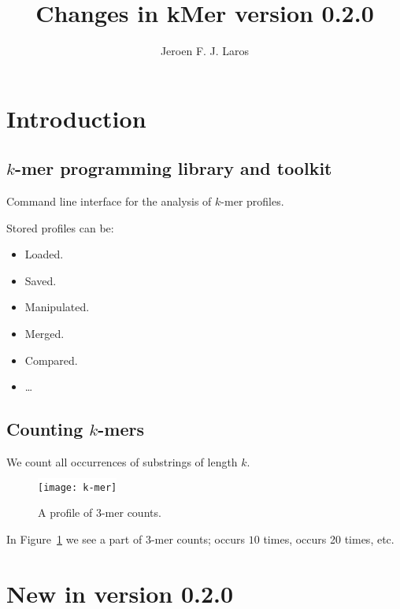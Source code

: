\documentclass[slidestop]{beamer}
\title{Changes in kMer version 0.2.0}
\author{Jeroen F. J. Laros}
\begin{document}

\bodytemplate

\section{Introduction}
\subsection{$k$-mer programming library and toolkit}
\begin{pframe}
  Command line interface for the analysis of $k$-mer profiles.
  \bigskip
  \pause

  Stored profiles can be:
  \begin{itemize}
    \item Loaded.
    \item Saved.
    \item Manipulated.
    \item Merged.
    \item Compared.
    \item \ldots
  \end{itemize}

  \vfill
\end{pframe}

\subsection{Counting $k$-mers}
\begin{pframe}
  We count all occurrences of substrings of length $k$.
  \pause

  \begin{figure}
    \colorbox{white}{
      \texttt{[image: k-mer]}
    }
    \vspace{-0.5cm}
    \caption{A profile of $3$-mer counts.} \label{fig:kmerprofile}
  \end{figure}

  In Figure~\ref{fig:kmerprofile} we see a part of $3$-mer counts; 
  occurs $10$ times,  occurs 20 times, etc.
\end{pframe}

\section{New in version 0.2.0}
\end{document}
